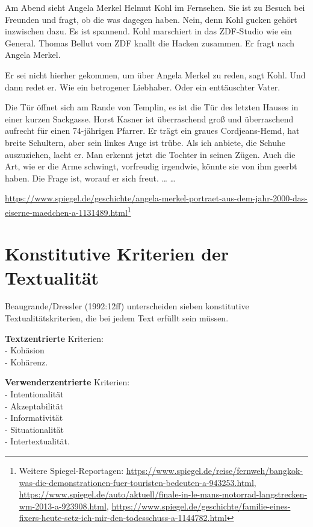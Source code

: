 \documentclass[
  letterpaper,
]{scrbook}
\begin{document}
Am Abend sieht Angela Merkel Helmut Kohl im Fernsehen. Sie ist zu Besuch
bei Freunden und fragt, ob die was dagegen haben. Nein, denn Kohl gucken
gehört inzwischen dazu. Es ist spannend. Kohl marschiert in das
ZDF-Studio wie ein General. Thomas Bellut vom ZDF knallt die Hacken
zusammen. Er fragt nach Angela Merkel.

Er sei nicht hierher gekommen, um über Angela Merkel zu reden, sagt
Kohl. Und dann redet er. Wie ein betrogener Liebhaber. Oder ein
enttäuschter Vater.

Die Tür öffnet sich am Rande von Templin, es ist die Tür des letzten
Hauses in einer kurzen Sackgasse. Horst Kasner ist überraschend groß und
überraschend aufrecht für einen 74-jährigen Pfarrer. Er trägt ein graues
Cordjeans-Hemd, hat breite Schultern, aber sein linkes Auge ist trübe.
Als ich anbiete, die Schuhe auszuziehen, lacht er. Man erkennt jetzt die
Tochter in seinen Zügen. Auch die Art, wie er die Arme schwingt,
vorfreudig irgendwie, könnte sie von ihm geerbt haben. Die Frage ist,
worauf er sich freut. \ldots{} \ldots{}

\url{https://www.spiegel.de/geschichte/angela-merkel-portraet-aus-dem-jahr-2000-das-eiserne-maedchen-a-1131489.html}\footnote{Weitere
  Spiegel-Reportagen:
  \url{https://www.spiegel.de/reise/fernweh/bangkok-was-die-demonstrationen-fuer-touristen-bedeuten-a-943253.html},
  \url{https://www.spiegel.de/auto/aktuell/finale-in-le-mans-motorrad-langstrecken-wm-2013-a-923908.html},
  \url{https://www.spiegel.de/geschichte/familie-eines-fixers-heute-setz-ich-mir-den-todesschuss-a-1144782.html}}

\hypertarget{konstitutive-kriterien-der-textualituxe4t}{%
\section{Konstitutive Kriterien der
Textualität}\label{konstitutive-kriterien-der-textualituxe4t}}

Beaugrande/Dressler (1992:12ff) unterscheiden sieben konstitutive
Textualitätskriterien, die bei jedem Text erfüllt sein müssen.

\textbf{Textzentrierte} Kriterien:\\
- Kohäsion\\
- Kohärenz.

\textbf{Verwenderzentrierte} Kriterien:\\
- Intentionalität\\
- Akzeptabilität\\
- Informativität\\
- Situationalität\\
- Intertextualität.
\end{document}

